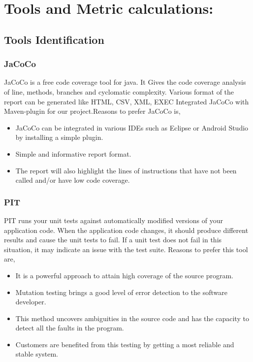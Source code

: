 \documentclass[letterpaper, 12 pt, conference]{ieeetran}  %
\begin{document}
\section{Tools and Metric calculations:}
\subsection{Tools Identification}

\subsubsection{JaCoCo} JaCoCo is a free code coverage tool for java.
It Gives the code coverage analysis of line, methods, branches and cyclomatic complexity.
Various format of the report can be generated like HTML, CSV, XML, EXEC
Integrated JaCoCo with Maven-plugin for our project.Reasons to prefer JaCoCo is,
\begin{itemize}
  \item JaCoCo can be integrated in various IDEs such as Eclipse or Android Studio by installing a simple plugin.
  \item Simple and informative report format.
  \item The report will also highlight the lines of instructions that have not been called and/or have low code coverage.
\end{itemize}
\smallskip
\subsubsection{PIT}
PIT runs your unit tests against automatically modified versions of your application code. 
When the application code changes, it should produce different results and cause the unit tests to fail. \cite{pit}
If a unit test does not fail in this situation, it may indicate an issue with the test suite.
Reasons to prefer this tool are,\cite{pit} \cite{pitinfo}
\begin{itemize}
  \item It is a powerful approach to attain high coverage of the source program.
  \item Mutation testing brings a good level of error detection to the software developer.
  \item This method uncovers ambiguities in the source code and has the capacity to detect all the faults in the program.
  \item Customers are benefited from this testing by getting a most reliable and stable system.
\end{itemize}
\smallskip
\end{document}
